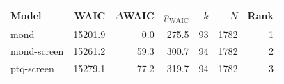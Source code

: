\begin{tabular}{lrrrrrr}
\toprule
Model & WAIC & $\Delta$WAIC & $p_{\mathrm{WAIC}}$ & $k$ & $N$ & Rank \\
\midrule
mond & 15201.9 & 0.0 & 275.5 & 93 & 1782 & 1 \\
mond-screen & 15261.2 & 59.3 & 300.7 & 94 & 1782 & 2 \\
ptq-screen & 15279.1 & 77.2 & 319.7 & 94 & 1782 & 3 \\
\bottomrule
\end{tabular}
